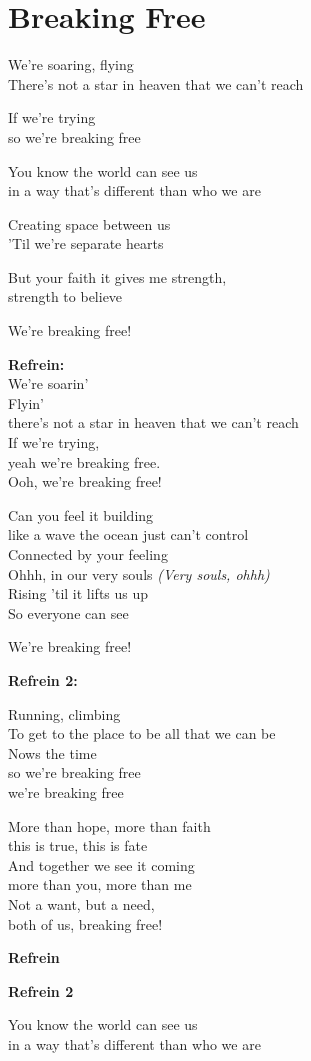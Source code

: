 \section{Breaking Free}
We're soaring, flying\\
There's not a star in heaven that we can’t reach

If we're trying\\
so we're breaking free

You know the world can see us\\
in a way that's different than who we are

Creating space between us\\
'Til we're separate hearts

But your faith it gives me strength,\\
strength to believe

We're breaking free!

\textbf{Refrein:}\\
We're soarin'\\
Flyin'\\
there's not a star in heaven that we can’t reach\\
If we're trying,\\
yeah we're breaking free.\\
Ooh, we're breaking free!

Can you feel it building\\
like a wave the ocean just can’t control\\
Connected by your feeling\\
Ohhh, in our very souls \textit{(Very souls, ohhh)}\\
Rising 'til it lifts us up\\
So everyone can see

We're breaking free!

\textbf{Refrein 2:}

Running, climbing\\
To get to the place to be all that we can be\\
Nows the time\\
so we're breaking free\\
we're breaking free

More than hope, more than faith\\
this is true, this is fate\\
And together we see it coming\\
more than you, more than me\\
Not a want, but a need,\\
both of us, breaking free!

\textbf{Refrein}

\textbf{Refrein 2}

You know the world can see us\\
in a way that's different than who we are
